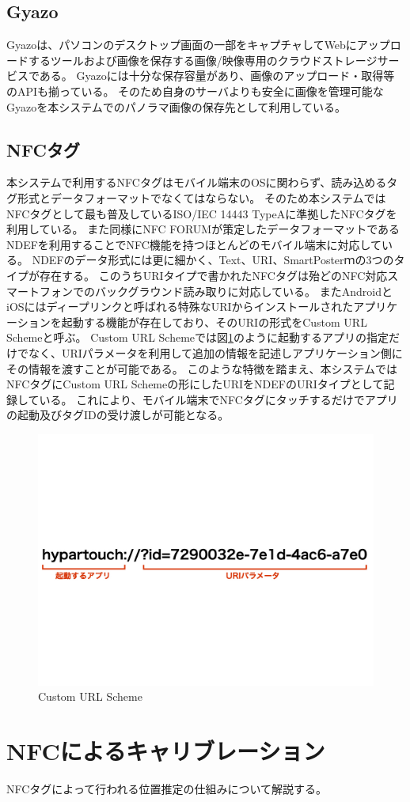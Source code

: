 \subsection{Gyazo}
Gyazoは、パソコンのデスクトップ画面の一部をキャプチャしてWebにアップロードするツールおよび画像を保存する画像/映像専用のクラウドストレージサービスである。
Gyazoには十分な保存容量があり、画像のアップロード・取得等のAPIも揃っている。
そのため自身のサーバよりも安全に画像を管理可能なGyazoを本システムでのパノラマ画像の保存先として利用している。

\subsection{NFCタグ}
本システムで利用するNFCタグはモバイル端末のOSに関わらず、読み込めるタグ形式とデータフォーマットでなくてはならない。
そのため本システムではNFCタグとして最も普及しているISO/IEC 14443 TypeAに準拠したNFCタグを利用している。
また同様にNFC FORUMが策定したデータフォーマットであるNDEFを利用することでNFC機能を持つほとんどのモバイル端末に対応している。
NDEFのデータ形式には更に細かく、Text、URI、SmartPosterｍの3つのタイプが存在する。
このうちURIタイプで書かれたNFCタグは殆どのNFC対応スマートフォンでのバックグラウンド読み取りに対応している。
またAndroidとiOSにはディープリンクと呼ばれる特殊なURIからインストールされたアプリケーションを起動する機能が存在しており、そのURIの形式をCustom URL Schemeと呼ぶ。
Custom URL Schemeでは図\ref{fig:custom_url_scheme}のように起動するアプリの指定だけでなく、URIパラメータを利用して追加の情報を記述しアプリケーション側にその情報を渡すことが可能である。
このような特徴を踏まえ、本システムではNFCタグにCustom URL Schemeの形にしたURIをNDEFのURIタイプとして記録している。
これにより、モバイル端末でNFCタグにタッチするだけでアプリの起動及びタグIDの受け渡しが可能となる。


\begin{figure}[h]
  \centering
  \includegraphics[width=150mm]{images/custom_url_scheme.jpg}
  \caption{Custom URL Scheme} \label{fig:custom_url_scheme}
\end{figure}


\section{NFCによるキャリブレーション}
NFCタグによって行われる位置推定の仕組みについて解説する。

